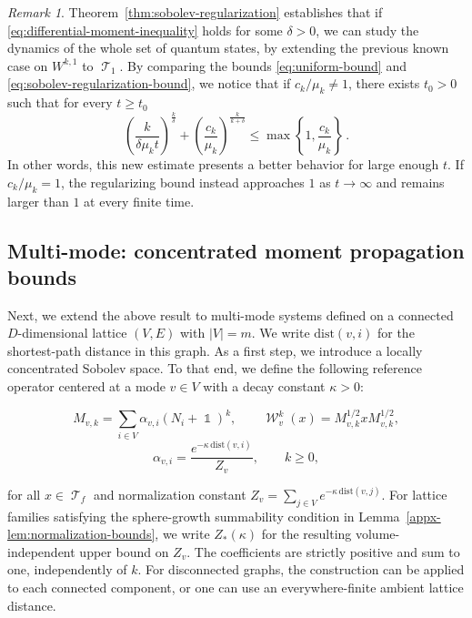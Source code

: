 \documentclass[11pt]{article}
\theoremstyle{myplain}
\theoremstyle{mydefinition}
\theoremstyle{remark}
\newtheorem{rmk}[ex]{Remark}
\DeclareMathOperator{\cT}{\mathcal{T}}
\DeclareMathOperator{\cW}{\mathcal{W}}
\DeclareMathOperator{\1}{\mathds{1}}
\begin{document}
        \begin{rmk}
            Theorem~\ref{thm:sobolev-regularization} establishes that if \eqref{eq:differential-moment-inequality} holds for some $\delta>0$, we can study the dynamics of the whole set of quantum states, by extending the previous known case on $W^{k,1}$ to $\cT_1$. By comparing the bounds \eqref{eq:uniform-bound} and \eqref{eq:sobolev-regularization-bound}, we notice that if $c_k/\mu_k\neq1$, there exists $t_0>0$ such that for every $t \geq t_0$
            \begin{equation}
                \left( \frac{k}{\delta \mu_k t}\right)^{\frac{k}{\delta}}+\left( \frac{c_k}{\mu_k} \right)^{\frac{k}{k+\delta}}\leq \max\left\{ 1,\frac{c_k}{\mu_k} \right\}\, .
            \end{equation}
            In other words, this new estimate presents a better behavior for large enough $t$. If $c_k/\mu_k=1$, the regularizing bound instead approaches $1$ as $t\to\infty$ and remains larger than $1$ at every finite time.
        \end{rmk}


    \subsection{Multi-mode: concentrated moment propagation bounds}\label{subsec:multi-mode-regularizing}

        Next, we extend the above result to multi-mode systems defined on a connected $D$-dimensional lattice $(V, E)$ with $|V| = m$. We write $\mathrm{dist}(v,i)$ for the shortest-path distance in this graph. As a first step, we introduce a locally concentrated Sobolev space. To that end, we define the following reference operator centered at a mode $v \in V$ with a decay constant $\kappa > 0$:
        
        \begin{equation}\label{eq:multi-mode-sobolev-operator}
            M_{v,k}=\sum_{i\in V}\alpha_{v,i}(N_i+\1)^k,
            \qquad
            \cW_v^k(x)=M_{v,k}^{1/2}xM_{v,k}^{1/2},
        \end{equation}
        \begin{equation}\label{eq:concentration-weights}
            \alpha_{v,i}=\frac{e^{-\kappa\,\mathrm{dist}(v,i)}}{Z_v},
            \qquad k\geq0,
        \end{equation}
        
        for all $x \in \cT_f$ and normalization constant $Z_v=\sum_{j \in V} e^{-\kappa \, \mathrm{dist}(v,j)}$. For lattice families satisfying the sphere-growth summability condition in Lemma~\ref{appx-lem:normalization-bounds}, we write $Z_*(\kappa)$ for the resulting volume-independent upper bound on $Z_v$. The coefficients are strictly positive and sum to one, independently of $k$. For disconnected graphs, the construction can be applied to each connected component, or one can use an everywhere-finite ambient lattice distance.
\end{document}
